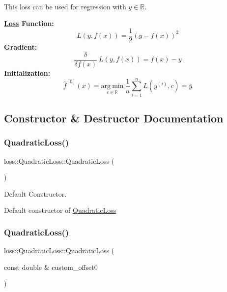 This loss can be used for regression with $y \in \mathbb{R}$.

{\bfseries \hyperlink{classloss_1_1_loss}{Loss} Function\+:} \[ L(y, f(x)) = \frac{1}{2}\left( y - f(x) \right)^2 \] {\bfseries Gradient\+:} \[ \frac{\delta}{\delta f(x)}\ L(y, f(x)) = f(x) - y \] {\bfseries Initialization\+:} \[ \hat{f}^{[0]}(x) = \underset{c\in\mathbb{R}}{\mathrm{arg~min}}\ \frac{1}{n}\sum\limits_{i=1}^n L\left(y^{(i)}, c\right) = \bar{y} \] 

\subsection{Constructor \& Destructor Documentation}
\mbox{\label{classloss_1_1_quadratic_loss_acf4a3be5ab3c3aa4d574748c8864bacd}} 
\subsubsection{\texorpdfstring{Quadratic\+Loss()}{QuadraticLoss()}\hspace{0.1cm}{\footnotesize\ttfamily [1/2]}}
{\footnotesize\ttfamily loss\+::\+Quadratic\+Loss\+::\+Quadratic\+Loss (\begin{DoxyParamCaption}{ }\end{DoxyParamCaption})}



Default Constructor. 

Default constructor of {\ttfamily \hyperlink{classloss_1_1_quadratic_loss}{Quadratic\+Loss}} \mbox{\label{classloss_1_1_quadratic_loss_a41fd44734dc6d4f4189e02c79bcf4095}} 
\subsubsection{\texorpdfstring{Quadratic\+Loss()}{QuadraticLoss()}\hspace{0.1cm}{\footnotesize\ttfamily [2/2]}}
{\footnotesize\ttfamily loss\+::\+Quadratic\+Loss\+::\+Quadratic\+Loss (\begin{DoxyParamCaption}\item[{const double \&}]{custom\+\_\+offset0 }\end{DoxyParamCaption})}



